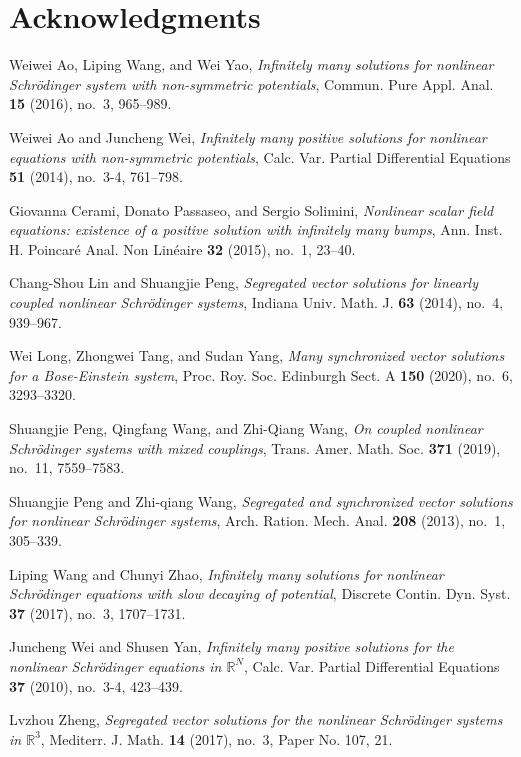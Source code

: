 \documentclass[a4paper,11pt]{article}
\theoremstyle{remark}
\begin{document}
\section*{Acknowledgments}


\begin{thebibliography}{10}
Weiwei Ao, Liping Wang, and Wei Yao, \emph{Infinitely many solutions for
  nonlinear {S}chr\"{o}dinger system with non-symmetric potentials}, Commun.
  Pure Appl. Anal. \textbf{15} (2016), no.~3, 965--989. 

Weiwei Ao and Juncheng Wei, \emph{Infinitely many positive solutions for
  nonlinear equations with non-symmetric potentials}, Calc. Var. Partial
  Differential Equations \textbf{51} (2014), no.~3-4, 761--798. 

Giovanna Cerami, Donato Passaseo, and Sergio Solimini, \emph{Nonlinear scalar
  field equations: existence of a positive solution with infinitely many
  bumps}, Ann. Inst. H. Poincar\'{e} Anal. Non Lin\'{e}aire \textbf{32} (2015),
  no.~1, 23--40. 

Chang-Shou Lin and Shuangjie Peng, \emph{Segregated vector solutions for
  linearly coupled nonlinear {S}chr\"{o}dinger systems}, Indiana Univ. Math. J.
  \textbf{63} (2014), no.~4, 939--967. 

Wei Long, Zhongwei Tang, and Sudan Yang, \emph{Many synchronized vector
  solutions for a {B}ose-{E}instein system}, Proc. Roy. Soc. Edinburgh Sect. A
  \textbf{150} (2020), no.~6, 3293--3320. 

Shuangjie Peng, Qingfang Wang, and Zhi-Qiang Wang, \emph{On coupled nonlinear
  {S}chr\"{o}dinger systems with mixed couplings}, Trans. Amer. Math. Soc.
  \textbf{371} (2019), no.~11, 7559--7583. 

Shuangjie Peng and Zhi-qiang Wang, \emph{Segregated and synchronized vector
  solutions for nonlinear {S}chr\"{o}dinger systems}, Arch. Ration. Mech. Anal.
  \textbf{208} (2013), no.~1, 305--339. 

Liping Wang and Chunyi Zhao, \emph{Infinitely many solutions for nonlinear
  {S}chr\"{o}dinger equations with slow decaying of potential}, Discrete
  Contin. Dyn. Syst. \textbf{37} (2017), no.~3, 1707--1731. 

Juncheng Wei and Shusen Yan, \emph{Infinitely many positive solutions for the
  nonlinear {S}chr\"{o}dinger equations in {$\mathbb R^N$}}, Calc. Var. Partial
  Differential Equations \textbf{37} (2010), no.~3-4, 423--439. 

Lvzhou Zheng, \emph{Segregated vector solutions for the nonlinear
  {S}chr\"{o}dinger systems in {$\mathbb{R}^3$}}, Mediterr. J. Math. \textbf{14}
  (2017), no.~3, Paper No. 107, 21. 

\end{thebibliography}



%
\end{document}
